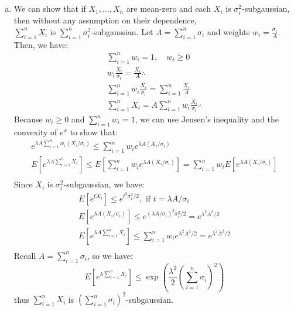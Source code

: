 \documentclass[11pt,a4paper,margin=1in]{article}
\begin{document}
\section{}
\begin{enumerate}[(a)]
    \item We can show that if $X_1, \dots, X_n$ are mean-zero and each $X_i$ is
    $\sigma_i^2$-subgaussian, then without any assumption on their dependence, \\
    $\sum_{i=1}^n X_i$ is $\sum_{i=1}^n \sigma_i^2$-subgaussian.
    Let $A = \sum_{i=1}^n \sigma_i$ and weights $w_i = \frac{\sigma_i}{A}$. 
    Then, we have:
    \begin{gather*}
        \sum_{i=1}^n w_i = 1, \quad w_i \geq 0 \\
        w_i\frac{X_i}{\sigma_i} = \frac{X_i}{A} \therefore \\
        \sum_{i=1}^n w_i\frac{X_i}{\sigma_i} = \sum_{i=1}^n \frac{X_i}{A} \\
        \sum_{i=1}^n X_i = A \sum_{i=1}^n w_i\frac{X_i}{\sigma_i} \therefore
    \end{gather*}
    Because $w_i \geq 0$ and $\sum_{i=1}^n w_i = 1$, we can use Jensen's inequality
    and the convexity of $e^x$ to show that:
    \begin{gather*}
        e^{\lambda A \sum_{i=1}^n w_i(X_i/\sigma_i)} \leq \sum_{i=1}^n w_i e^{\lambda A (X_i/\sigma_i)} \\
        E[e^{\lambda A \sum_{i=1}^n X_i}] \leq E\left[\sum_{i=1}^n w_i e^{\lambda A (X_i/\sigma_i)}\right] = \sum_{i=1}^n w_i E[e^{\lambda A (X_i/\sigma_i)}] \\
    \end{gather*}
    Since $X_i$ is $\sigma_i^2$-subgaussian, we have:
    \begin{gather*}
        E[e^{tX_i}] \leq e^{t^2\sigma_i^2/2}, \text{ if } t = \lambda A / \sigma_i \\
        E[e^{\lambda A (X_i/\sigma_i)}] \leq e^{(\lambda A / \sigma_i)^2\sigma_i^2/2} = e^{\lambda^2 A^2/2} \\
        E[e^{\lambda A \sum_{i=1}^n X_i}] \leq \sum_{i=1}^n w_i e^{\lambda^2 A^2/2} = e^{\lambda^2 A^2/2} \\
    \end{gather*}
    Recall $A = \sum_{i=1}^n \sigma_i$, so we have:
    \[
        E[e^{\lambda \sum_{i=1}^n X_i}] \leq \exp\left(\frac{\lambda^2}{2} \left(\sum_{i=1}^n \sigma_i\right)^2\right)  
    \]
    thus $\sum_{i=1}^n X_i$ is $\left(\sum_{i=1}^n \sigma_i\right)^2$-subgaussian.

\end{enumerate}
\end{document}
